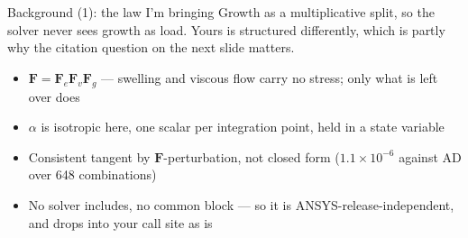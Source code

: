 \documentclass[aspectratio=169,11pt]{beamer}
\begin{document}
\begin{frame}{Background (1): the law I'm bringing}
\small Growth as a multiplicative split, so the solver never sees growth as
load. Yours is structured differently, which is partly why the citation
question on the next slide matters.
\vspace{3pt}
\begin{center}
\end{center}
\vspace{2pt}
\begin{itemize}\footnotesize
  \item $\bm{F}=\bm{F}_e\bm{F}_v\bm{F}_g$ --- swelling and viscous flow carry no
        stress; only what is left over does
  \item $\alpha$ is isotropic here, one scalar per integration point, held in
        a state variable
  \item Consistent tangent by $\bm{F}$-perturbation, not closed form
        ($1.1\times10^{-6}$ against AD over 648 combinations)
  \item No solver includes, no common block --- so it is
        ANSYS-release-independent, and drops into your call site as is
\end{itemize}
\end{frame}
\end{document}
